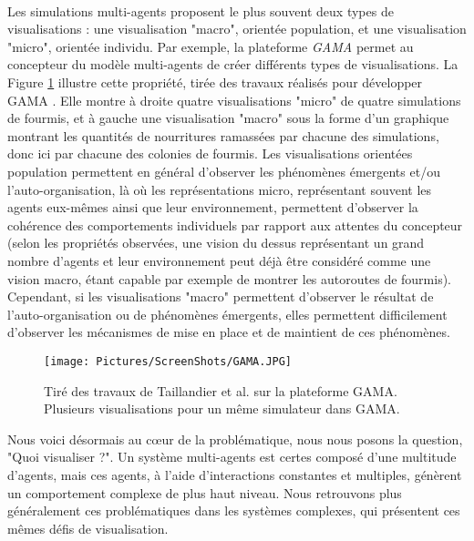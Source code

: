 		\paragraph{}
		
		Les simulations multi-agents proposent le plus souvent deux types de visualisations : une visualisation "macro", orientée population, et une visualisation "micro", orientée individu. Par exemple, la plateforme \textit{GAMA} \cite{taillandier_building_2019} permet au concepteur du modèle multi-agents de créer différents types de visualisations. La Figure \ref{GAMA} illustre cette propriété, tirée des travaux réalisés pour développer GAMA \cite{taillandier_building_2019}. Elle montre à droite quatre visualisations "micro" de quatre simulations de fourmis, et à gauche une visualisation "macro" sous la forme d'un graphique montrant les quantités de nourritures ramassées par chacune des simulations, donc ici par chacune des colonies de fourmis.
		Les visualisations orientées population permettent en général d'observer les phénomènes émergents et/ou l'auto-organisation, là où les représentations micro, représentant souvent les agents eux-mêmes ainsi que leur environnement, permettent d'observer la cohérence des comportements individuels par rapport aux attentes du concepteur (selon les propriétés observées, une vision du dessus représentant un grand nombre d'agents et leur environnement peut déjà être considéré comme une vision macro, étant capable par exemple de montrer les autoroutes de fourmis). Cependant, si les visualisations "macro" permettent d'observer le résultat de l'auto-organisation ou de phénomènes émergents, elles permettent difficilement d'observer les mécanismes de mise en place et de maintient de ces phénomènes.
		
		\begin{figure}
			\centering
			\texttt{[image: Pictures/ScreenShots/GAMA.JPG]}
			\caption{Tiré des travaux de Taillandier et al. \cite{taillandier_building_2019} sur la plateforme GAMA. Plusieurs visualisations pour un même simulateur dans GAMA.}
			\label{GAMA}
		\end{figure}
		
		Nous voici désormais au cœur de la problématique, nous nous posons la question, "Quoi visualiser ?". Un système multi-agents est certes composé d'une multitude d'agents, mais ces agents, à l'aide d'interactions constantes et multiples, génèrent un comportement complexe de plus haut niveau. Nous retrouvons plus généralement ces problématiques dans les systèmes complexes, qui présentent ces mêmes défis de visualisation.
		
